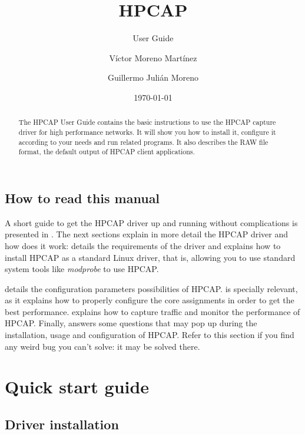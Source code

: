 \documentclass[a4paper,oneside]{hpman}
\title{HPCAP}
\subtitle{User Guide}
\author{V\'ictor Moreno Mart\'inez \and Guillermo Juli\'an Moreno}
\date{\today}
\begin{document}
\renewcommand{\arraystretch}{1.5}



\begin{abstract}
The HPCAP User Guide contains the basic instructions to use the HPCAP capture driver for high performance networks. It will show you how to install it, configure it according to your needs and run related programs. It also describes the RAW file format, the default output of HPCAP client applications.
\end{abstract}

\maketitle

\section*{How to read this manual}

A short guide to get the HPCAP driver up and running without complications is presented in . The next sections explain in more detail the HPCAP driver and how does it work:  details the requirements of the driver and explains how to install HPCAP as a standard Linux driver, that is, allowing you to use standard system tools like \textit{modprobe} to use HPCAP.

 details the configuration parameters possibilities of HPCAP.  is specially relevant, as it explains how to properly configure the core assignments in order to get the best performance.  explains how to capture traffic and monitor the performance of HPCAP. Finally,  answers some questions that may pop up during the installation, usage and configuration of HPCAP. Refer to this section if you find any weird bug you can't solve: it may be solved there.

\tableofcontents

\newpage

\chapter{Quick start guide}
\label{sec:QuickStart}

\section{Driver installation}
\label{sec:QuickInstallation}
\end{document}
